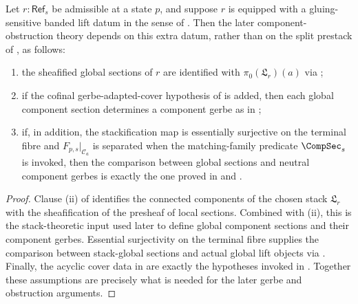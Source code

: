 \begin{proposition}\label{prop:gluing-sensitive-lift-consequences}
Let $r:\mathsf{Ref}_s$ be admissible at a state $p$, and suppose $r$ is equipped with a gluing-sensitive banded lift datum in the sense of . Then the later component-obstruction theory depends on this extra datum, rather than on the split prestack of , as follows:
\begin{enumerate}[label=(\roman*),nosep]
\item the sheafified global sections of $r$ are identified with $\pi_0(\mathfrak L_r)(a)$ via ;
\item if the cofinal gerbe-adapted-cover hypothesis of
 is added,
then each global component section determines a component gerbe as in
;
\item if, in addition, the stackification map is essentially surjective on the terminal fibre and $F_{p,s}|_{\mathcal C_a}$ is separated when the matching-family predicate \(\CompSec_s\) is invoked, then the comparison between global sections and neutral component gerbes is exactly the one proved in
 and
.
\end{enumerate}
\end{proposition}

\begin{proof}
Clause \textup{(ii)} of  identifies the connected components of the chosen stack $\mathfrak L_r$ with the sheafification of the presheaf of local sections. Combined with (ii), this is the stack-theoretic input used later to define global component sections and their component gerbes. Essential surjectivity on the terminal fibre supplies the comparison between stack-global sections and actual global lift objects via . Finally, the acyclic cover data in  are exactly the hypotheses invoked in . Together these assumptions are precisely what is needed for the later gerbe and obstruction arguments.
\end{proof}

